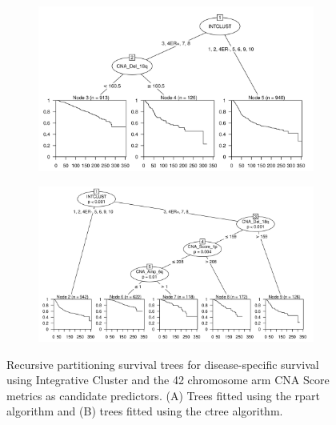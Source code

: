 \begin{figure}[!h]
\centering

\vspace{0.5cm}

\begin{subfigure}{\textwidth}
\subcaption{}
\includegraphics[width=1\textwidth]{../figures/Chapter_3/PA_PartyKit_Survival_Score_DSS_INTCLUST.png}
\end{subfigure}

\vspace{2cm}

\begin{subfigure}{\textwidth}
\subcaption{}
\includegraphics[width=1\textwidth]{../figures/Chapter_3/PA_Ctree_Survival_Score_DSS_INTCLUST.png}
\end{subfigure}

\vspace{0.5cm}

\caption[Recursive partitioning survival trees for disease-specific survival using Integrative Cluster and the 42 chromosome arm CNA Score metrics as candidate predictors.]{Recursive partitioning survival trees for disease-specific survival using Integrative Cluster and the 42 chromosome arm CNA Score metrics as candidate predictors. (A) Trees fitted using the rpart algorithm and (B) trees fitted using the ctree algorithm.}
\label{fig:INTCLUST_PA_CNA_Score_DSS}
\end{figure}

